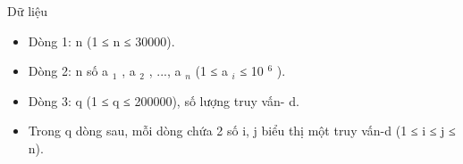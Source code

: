 Dữ liệu
\begin{itemize}
	\item     Dòng 1: n (1 ≤ n ≤ 30000).   
	\item     Dòng 2: n số a    $_     1    $    , a    $_     2    $    , ...,   a    $_     n    $    (1 ≤ a    $_     i    $    ≤   10    $^     6    $    ).   
	\item     Dòng 3: q (1 ≤ q ≤ 200000), số lượng truy vấn-  d.   
	\item     Trong q dòng sau, mỗi dòng chứa 2 số i, j biểu thị một   truy vấn-d (1 ≤ i ≤ j ≤ n).   
\end{itemize}